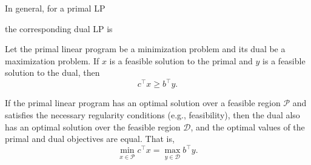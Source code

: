 \documentclass[11pt]{article}
\begin{document}
\vs{1cm}
In general, for a primal LP

\vs{6cm}
the corresponding dual LP is

\vs{6cm}
\begin{theorem}
Let the primal linear program be a minimization problem and its dual be a maximization problem. If \( x \) is a feasible solution to the primal and \( y \) is a feasible solution to the dual, then
\[
c^\top x \geq b^\top y.
\]
\end{theorem}

\begin{theorem}
If the primal linear program has an optimal solution over a feasible region $\mathcal{P}$ and satisfies the necessary regularity conditions (e.g., feasibility), then the dual also has an optimal solution over the feasible region $\mathcal{D}$, and the optimal values of the primal and dual objectives are equal. That is,
\[
\min_{x \in \mathcal{P}} c^\top x = \max_{y \in \mathcal{D}} b^\top y.
\]
\end{theorem}
\end{document}
